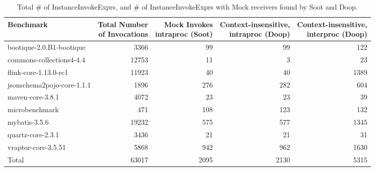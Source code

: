 \begin{table*}
	\centering
	\caption{Total \# of InstanceInvokeExprs, and \# of InstanceInvokeExprs with Mock receivers found by Soot and Doop.}
	\begin{tabular}{lrrrr}
		\toprule
		Benchmark & \thead{Total Number \\ of Invocations} & \thead{Mock Invokes \\ intraproc (Soot)}  & \thead{Context-insensitive, \\ intraproc (Doop)} &\thead{Context-insensitive, \\ interproc (Doop)} \\
		\midrule
		bootique-2.0.B1-bootique           		&  3366     &  99  & 99   & 122    \\
		commons-collections4-4.4       			&  12753    &  11   &  3   & 23   \\
		flink-core-1.13.0-rc1           		&  11923    &  40   & 40   & 1389   \\
		jsonschema2pojo-core-1.1.1      	     	&  1896     &  276  & 282  & 604   \\
		maven-core-3.8.1           			&  4072     &  23   & 23   & 39  \\
		microbenchmark         		  		&  471      &  108  & 123  & 132   \\
		mybatis-3.5.6         		  		&  19232    &  575  & 577  & 1345     \\
		quartz-core-2.3.1       	  		&  3436     &  21   & 21   & 31    \\
		vraptor-core-3.5.51        	  		&  5868     &  942  & 962  & 1630   \\
		\bottomrule
		Total        	  				&  63017    & 2095  & 2130  & 5315   \\
	\end{tabular}
	\label{tab:invokes}
\end{table*}


